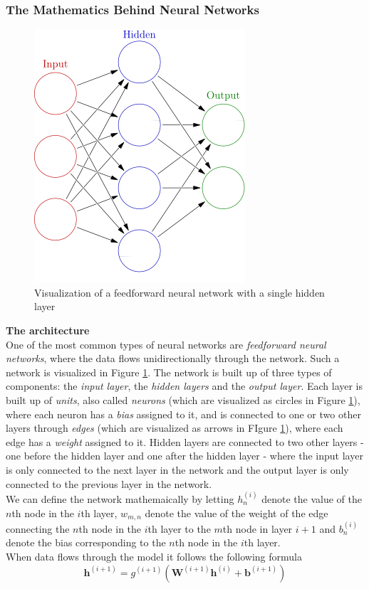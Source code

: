 \documentclass[main.tex]{subfiles}
\begin{document}
\subsubsection{The Mathematics Behind Neural Networks}
\begin{figure}[H]
    \centering
    \includegraphics[height = 5 cm]{entities/feed_forward_nn.jpg}
    \caption{Visualization of a feedforward neural network with a single hidden layer \cite{feedforward_nn}}
    \label{feedforward_nn}
\end{figure}
\textbf{The architecture} \\
One of the most common types of neural networks are \textit{feedforward neural networks}, where the data flows unidirectionally through the network. Such a network is visualized in Figure \ref{feedforward_nn}. The network is built up of three types of components: the \textit{input layer}, the \textit{hidden layers} and the \textit{output layer}. Each layer is built up of \textit{units}, also called \textit{neurons} (which are visualized as circles in Figure \ref{feedforward_nn}), where each neuron has a \textit{bias} assigned to it, and is connected to one or two other layers through \textit{edges} (which are visualized as arrows in FIgure \ref{feedforward_nn}), where each edge has a \textit{weight} assigned to it. Hidden layers are connected to two other layers - one before the hidden layer and one after the hidden layer - where the input layer is only connected to the next layer in the network and the output layer is only connected to the previous layer in the network. \\
We can define the network mathemaically by letting $h_n ^{(i)}$ denote the value of the $n$th node in the $i$th layer, $w_{m, n}$ denote the value of the weight of the edge connecting the $n$th node in the $i$th layer to the $m$th node in layer $i + 1$ and $b_n ^{(i)}$ denote the bias corresponding to the $n$th node in the $i$th layer. \\
When data flows through the model it follows the following formula
$$\bm{h}^{(i + 1)} = g^{(i + 1)} \left( \bm{W}^{(i + 1)} \bm{h}^{(i)} + \bm{b}^{(i + 1)} \right)$$
\end{document}
